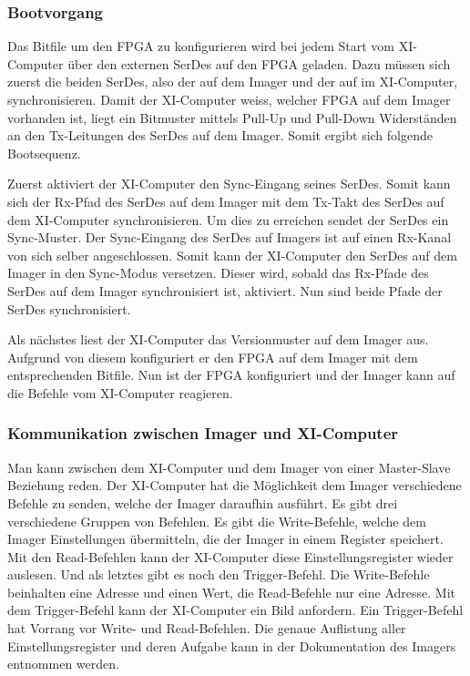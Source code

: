 \documentclass{article}
\begin{document}
\subsubsection*{Bootvorgang}
\label{sec:varian_boot_sequence}
Das Bitfile um den FPGA zu konfigurieren wird bei jedem Start vom XI-Computer über den externen SerDes auf den FPGA geladen. Dazu müssen sich zuerst die beiden SerDes, also der auf dem Imager und der auf im XI-Computer, synchronisieren. Damit der XI-Computer weiss, welcher FPGA auf dem Imager vorhanden ist, liegt ein Bitmuster mittels Pull-Up und Pull-Down Widerständen an den Tx-Leitungen des SerDes auf dem Imager. Somit ergibt sich folgende Bootsequenz.

Zuerst aktiviert der XI-Computer den Sync-Eingang seines SerDes. Somit kann sich der Rx-Pfad des SerDes auf dem Imager mit dem Tx-Takt des SerDes auf dem XI-Computer synchronisieren. Um dies zu erreichen sendet der SerDes ein Sync-Muster. Der Sync-Eingang des SerDes auf Imagers ist auf einen Rx-Kanal von sich selber angeschlossen. Somit kann der XI-Computer den SerDes auf dem Imager in den Sync-Modus versetzen. Dieser wird, sobald das Rx-Pfade des SerDes auf dem Imager synchronisiert ist, aktiviert. Nun sind beide Pfade der SerDes synchronisiert.

Als nächstes liest der XI-Computer das Versionmuster auf dem Imager aus. Aufgrund von diesem konfiguriert er den FPGA auf dem Imager mit dem entsprechenden Bitfile. Nun ist der FPGA konfiguriert und der Imager kann auf die Befehle vom XI-Computer reagieren. 

\subsubsection*{Kommunikation zwischen Imager und XI-Computer}
\label{sec:varian_com}

Man kann zwischen dem XI-Computer und dem Imager von einer Master-Slave Beziehung reden. Der XI-Computer hat die Möglichkeit dem Imager verschiedene Befehle zu senden, welche der Imager daraufhin ausführt. Es gibt drei verschiedene Gruppen von Befehlen. Es gibt die Write-Befehle, welche dem Imager Einstellungen übermitteln, die der Imager in einem Register speichert. Mit den Read-Befehlen kann der XI-Computer diese Einstellungsregister wieder auslesen. Und als letztes gibt es noch den Trigger-Befehl. Die Write-Befehle beinhalten eine Adresse und einen Wert, die Read-Befehle nur eine Adresse. Mit dem Trigger-Befehl kann der XI-Computer ein Bild anfordern. Ein Trigger-Befehl hat Vorrang vor Write- und Read-Befehlen. Die genaue Auflistung aller Einstellungsregister und deren Aufgabe kann in der Dokumentation des Imagers entnommen werden. 
\end{document}

